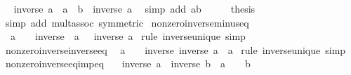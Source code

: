 \begin{isabellebody}
\ \isamarkupfalse%
\ {\isachardoublequoteopen}inverse\ a\ {\isacharasterisk}{\kern0pt}\ {\isacharparenleft}{\kern0pt}a\ {\isacharasterisk}{\kern0pt}\ b{\isacharparenright}{\kern0pt}\ {\isacharequal}{\kern0pt}\ inverse\ a{\isachardoublequoteclose}\ \isamarkupfalse%
\ {\isacharparenleft}{\kern0pt}simp\ add{\isacharcolon}{\kern0pt}\ ab{\isacharparenright}{\kern0pt}\isanewline
\ \ \isamarkupfalse%
\ \isamarkupfalse%
\ {\isacharquery}{\kern0pt}thesis\ \isamarkupfalse%
\ {\isacharparenleft}{\kern0pt}simp\ add{\isacharcolon}{\kern0pt}\ mult{\isachardot}{\kern0pt}assoc\ {\isacharbrackleft}{\kern0pt}symmetric{\isacharbrackright}{\kern0pt}{\isacharparenright}{\kern0pt}\isanewline
{}\isamarkupfalse%
%
\endisatagproof
{\isafoldproof}%
%
\isadelimproof
\isanewline
%
\endisadelimproof
\isanewline
{}\isamarkupfalse%
\ nonzero{\isacharunderscore}{\kern0pt}inverse{\isacharunderscore}{\kern0pt}minus{\isacharunderscore}{\kern0pt}eq{\isacharcolon}{\kern0pt}\isanewline
\ \ {\isachardoublequoteopen}a\ {\isasymnoteq}\ {}\ {\isasymLongrightarrow}\ inverse\ {\isacharparenleft}{\kern0pt}{\isacharminus}{\kern0pt}\ a{\isacharparenright}{\kern0pt}\ {\isacharequal}{\kern0pt}\ {\isacharminus}{\kern0pt}\ inverse\ a{\isachardoublequoteclose}\isanewline
%
\isadelimproof
%
\endisadelimproof
%
\isatagproof
{}\isamarkupfalse%
\ {\isacharparenleft}{\kern0pt}rule\ inverse{\isacharunderscore}{\kern0pt}unique{\isacharparenright}{\kern0pt}\ simp%
\endisatagproof
{\isafoldproof}%
%
\isadelimproof
\isanewline
%
\endisadelimproof
\isanewline
{}\isamarkupfalse%
\ nonzero{\isacharunderscore}{\kern0pt}inverse{\isacharunderscore}{\kern0pt}inverse{\isacharunderscore}{\kern0pt}eq{\isacharcolon}{\kern0pt}\isanewline
\ \ {\isachardoublequoteopen}a\ {\isasymnoteq}\ {}\ {\isasymLongrightarrow}\ inverse\ {\isacharparenleft}{\kern0pt}inverse\ a{\isacharparenright}{\kern0pt}\ {\isacharequal}{\kern0pt}\ a{\isachardoublequoteclose}\isanewline
%
\isadelimproof
%
\endisadelimproof
%
\isatagproof
{}\isamarkupfalse%
\ {\isacharparenleft}{\kern0pt}rule\ inverse{\isacharunderscore}{\kern0pt}unique{\isacharparenright}{\kern0pt}\ simp%
\endisatagproof
{\isafoldproof}%
%
\isadelimproof
\isanewline
%
\endisadelimproof
\isanewline
{}\isamarkupfalse%
\ nonzero{\isacharunderscore}{\kern0pt}inverse{\isacharunderscore}{\kern0pt}eq{\isacharunderscore}{\kern0pt}imp{\isacharunderscore}{\kern0pt}eq{\isacharcolon}{\kern0pt}\isanewline
\ \ \ {\isachardoublequoteopen}inverse\ a\ {\isacharequal}{\kern0pt}\ inverse\ b{\isachardoublequoteclose}\ \ {\isachardoublequoteopen}a\ {\isasymnoteq}\ {}{\isachardoublequoteclose}\ \ {\isachardoublequoteopen}b\ {\isasymnoteq}\ {}{\isachardoublequoteclose}\isanewline

\end{isabellebody}
